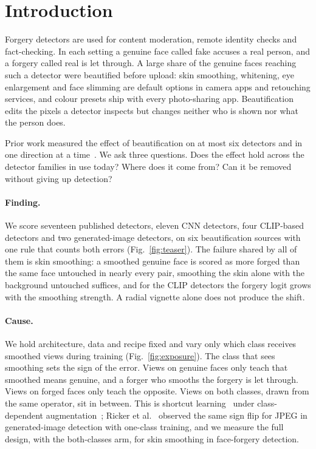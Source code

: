 \documentclass[conference]{IEEEtran}
\begin{document}
\section{Introduction}
Forgery detectors are used for content moderation, remote identity checks and fact-checking. In each setting a genuine face
called fake accuses a real person, and a forgery called real is let through. A large share of the genuine faces reaching
such a detector were beautified before upload: skin smoothing, whitening, eye enlargement and face slimming are default
options in camera apps and retouching services, and colour presets ship with every photo-sharing app. Beautification edits
the pixels a detector inspects but changes neither who is shown nor what the person does.

Prior work measured the effect of beautification on at most six detectors and in one direction at a
time~\cite{libourel2024,saeed2025,concas2025}. We ask three questions. Does the effect hold across the detector families
in use today? Where does it come from? Can it be removed without giving up detection?

\paragraph{Finding.} We score seventeen published detectors, eleven CNN detectors, four CLIP-based detectors and two
generated-image detectors, on six beautification sources with one rule that counts both errors (Fig.~\ref{fig:teaser}).
The failure shared by all of them is skin smoothing: a smoothed genuine face is scored as more forged than the same face
untouched in nearly every pair, smoothing the skin alone with the background untouched suffices, and for the CLIP detectors
the forgery logit grows with the smoothing strength. A radial vignette alone does not produce the shift.

\paragraph{Cause.} We hold architecture, data and recipe fixed and vary only which class receives smoothed views during
training (Fig.~\ref{fig:exposure}). The class that sees smoothing sets the sign of the error. Views on genuine faces only teach that smoothed means genuine, and a
forger who smooths the forgery is let through. Views on forged faces only teach the opposite. Views on both classes, drawn
from the same operator, sit in between. This is shortcut learning~\cite{geirhos2020} under class-dependent
augmentation~\cite{balestriero2022}; Ricker et al.~\cite{ricker2026biasid} observed the same sign flip for JPEG in
generated-image detection with one-class training, and we measure the full design, with the both-classes arm, for skin
smoothing in face-forgery detection.
\end{document}

